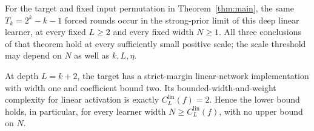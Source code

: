 \begin{proposition}\label{prop:linear-all-width}
For the target and fixed input permutation in
Theorem~\ref{thm:main}, the same $T_k=2^k-k-1$ forced rounds occur in the
strong-prior limit of this deep linear learner, at every fixed
$L\ge2$ and every fixed width $N\ge1$. All three conclusions of that
theorem hold at every sufficiently small positive scale; the scale
threshold may depend on $N$ as well as $k,L,\eta$.

At depth $L=k+2$, the target has a strict-margin linear-network
implementation with width one and coefficient bound two. Its
bounded-width-and-weight complexity for linear activation is exactly
$C_L^{\mathrm{lin}}(f)=2$. Hence the lower bound holds, in particular,
for every learner width $N\ge C_L^{\mathrm{lin}}(f)$, with no upper bound
on $N$.
\end{proposition}
